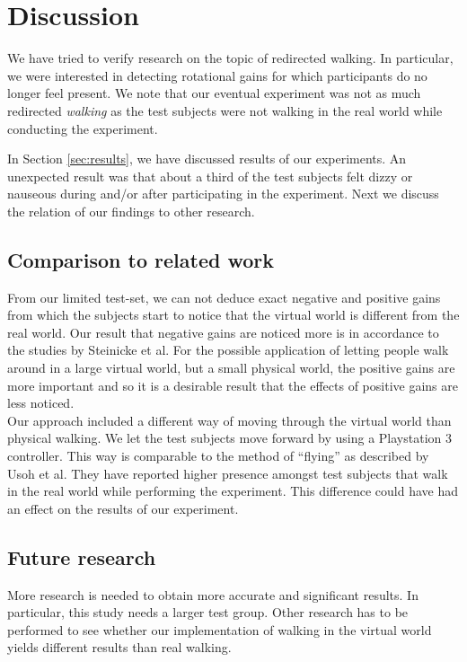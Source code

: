 \section{Discussion}
We have tried to verify research on the topic of redirected walking.
In particular, we were interested in detecting rotational gains for which participants do no longer feel present.
We note that our eventual experiment was not as much redirected \textit{walking} as the test subjects were not walking in the real world while conducting the experiment.

In Section \ref{sec:results}, we have discussed results of our experiments.
An unexpected result was that about a third of the test subjects felt dizzy or nauseous during and/or after participating in the experiment.
Next we discuss the relation of our findings to other research.

\subsection{Comparison to related work}
From our limited test-set, we can not deduce exact negative and positive gains from which the subjects start to notice that the virtual world is different from the real world.
Our result that negative gains are noticed more is in accordance to the studies by Steinicke et al. \cite{steinicke1}\cite{steinicke2}
For the possible application of letting people walk around in a large virtual world, but a small physical world, the positive gains are more important and so it is a desirable result that the effects of positive gains are less noticed.\\

Our approach included a different way of moving through the virtual world than physical walking.
We let the test subjects move forward by using a Playstation 3 controller.
This way is comparable to the method of ``flying'' as described by Usoh et al.\cite{usoh}
They have reported higher presence amongst test subjects that walk in the real world while performing the experiment.
This difference could have had an effect on the results of our experiment.

\subsection{Future research}
More research is needed to obtain more accurate and significant results.
In particular, this study needs a larger test group.
Other research has to be performed to see whether our implementation of walking in the virtual world yields different results than real walking.